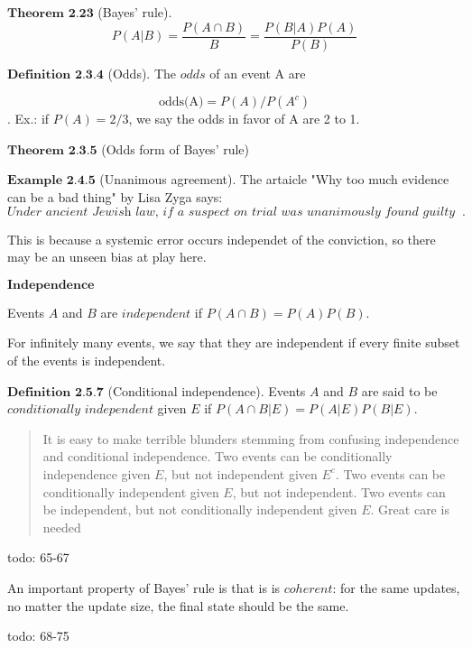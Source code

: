 \documentclass{article}
\begin{document}
    $\textbf{Theorem 2.23}$ (Bayes' rule).
    $$P(A|B)=\frac{P(A\cap B)}{B}=\frac{P(B|A)P(A)}{P(B)}$$

    $\textbf{Definition 2.3.4}$ (Odds). The $\textit{odds}$ of an event A are

    $$\textrm{odds(A)}=P(A)/P(A^c)$$. Ex.: if $P(A)=2/3$, we say the odds in favor of A are 2 to 1.

    $\textbf{Theorem 2.3.5}$ (Odds form of Bayes' rule)

    $\textbf{Example 2.4.5}$ (Unanimous agreement). The artaicle "Why too much evidence can be a bad thing" by Lisa Zyga says:\\

    $\textit{Under ancient Jewish law, if a suspect on trial was unanimously found guilty by all judges, then the suspect was acquitted. This reasoning
    sounds counterintuitive, but the legislators of teh time had noticed that unanimous agreement often indicates the presence of systemic error in 
    the judicial process}.$

    This is because a systemic error occurs independet of the conviction, so there may be an unseen bias at play here.

    $\textbf{Independence}$

    Events $A$ and $B$ are $\textit{independent}$ if $P(A\cap B) = P(A)P(B)$.

    For infinitely many events, we say that they are independent if every finite subset of the events is independent.

    $\textbf{Definition 2.5.7}$ (Conditional independence). Events $A$ and $B$ are said to be $\textit{conditionally independent}$ given $E$ if $P(A\cap B|E) = P(A|E)P(B|E)$.

    \begin{quote}
    It is easy to make terrible blunders stemming from confusing independence and conditional independence. Two events can be conditionally independence given $E$, but not independent given $E^c$. Two events
    can be conditionally independent given $E$, but not independent. Two events can be independent, but not conditionally independent given $E$.
    Great care is needed
    \end{quote}

    todo: 65-67

    An important property of Bayes' rule is that is is $coherent$: for the same updates, no matter the update size, the final state should be the same.

    todo: 68-75\\\\
\end{document}
